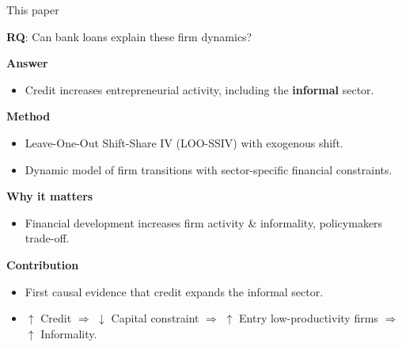\documentclass[aspectratio=169]{beamer}
\begin{document}


\begin{frame}{This paper} \label{this_paper}

\begin{center}
    \Large \textbf{RQ}: Can bank loans explain these firm dynamics?
\end{center}

\vspace{2mm}
\pause

\textbf{Answer}
\begin{itemize}
    \item Credit increases entrepreneurial activity, including the \textbf{informal} sector.
\end{itemize}

\vspace{1mm}
\pause

\textbf{Method}
\begin{itemize}
    \item Leave-One-Out Shift-Share IV (LOO-SSIV) with exogenous shift.
    \item Dynamic model of firm transitions with sector-specific financial constraints.
\end{itemize}

\vspace{1mm}
\pause

\textbf{Why it matters}
\begin{itemize}
    \item Financial development increases firm activity \& informality, policymakers trade-off.
\end{itemize}

\vspace{1mm}
\pause

\textbf{Contribution}
\begin{itemize}
    \item First causal evidence that credit expands the informal sector. 
    \item $\uparrow$ Credit $\Rightarrow$ $\downarrow$ Capital constraint $\Rightarrow$ $\uparrow$ Entry low-productivity firms $\Rightarrow$ $\uparrow$ Informality. 
\end{itemize}

\end{frame}

\end{document}
